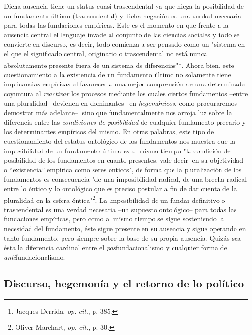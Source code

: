 \documentclass{book}
\begin{document}
Dicha ausencia tiene un status cuasi-trascendental ya que niega la
posibilidad de un fundamento último (trascendental) y dicha negación es
una verdad necesaria para todas las fundaciones empíricas. Este es el
momento en que frente a la ausencia central el lenguaje invade al
conjunto de las ciencias sociales y todo se convierte en discurso, es
decir, todo comienza a ser pensado como un "sistema en el que el
significado central, originario o trascendental no está nunca
absolutamente presente fuera de un sistema de diferencias"\footnote{Jacques
  Derrida, \emph{op. cit}., p. 385.}. Ahora bien, este cuestionamiento a
la existencia de un fundamento último no solamente tiene implicancias
empíricas al favorecer a una mejor comprensión de una determinada
coyuntura al \emph{reactivar} los procesos mediante los cuales ciertos
fundamentos --entre una pluralidad-- devienen en dominantes --en
\emph{hegemónicos}, como procuraremos demostrar más adelante--, sino que
fundamentalmente nos arroja luz sobre la diferencia entre las
\emph{condiciones de posibilidad} de cualquier fundamento precario y los
determinantes empíricos del mismo. En otras palabras, este tipo de
cuestionamiento del estatus ontológico de los fundamentos nos muestra
que la imposibilidad de un fundamento último es al mismo tiempo "la
condición de posibilidad de los fundamentos en cuanto presentes, vale
decir, en su objetividad o ``existencia'' empírica como seres ónticos",
de forma que la pluralización de los fundamentos es consecuencia "de una
imposibilidad radical, de una brecha radical entre lo óntico y lo
ontológico que es preciso postular a fin de dar cuenta de la pluralidad
en la esfera óntica"\footnote{Oliver Marchart, \emph{op. cit}., p. 30.}.
La imposibilidad de un fundar definitivo o trascendental es una verdad
necesaria --un supuesto ontológico-- para todas las fundaciones
empíricas, pero como al mismo tiempo se sigue sosteniendo la necesidad
del fundamento, éste sigue presente en su ausencia y sigue operando en
tanto fundamento, pero siempre sobre la base de su propia ausencia.
Quizás sea ésta la diferencia cardinal entre el
\emph{pos}fundacionalismo y cualquier forma de
\emph{anti}fundacionalismo.

\hypertarget{discurso-hegemonuxeda-y-el-retorno-de-lo-poluxedtico}{%
\subsection{Discurso, hegemonía y el retorno de lo
político}\label{discurso-hegemonuxeda-y-el-retorno-de-lo-poluxedtico}}
\end{document}
